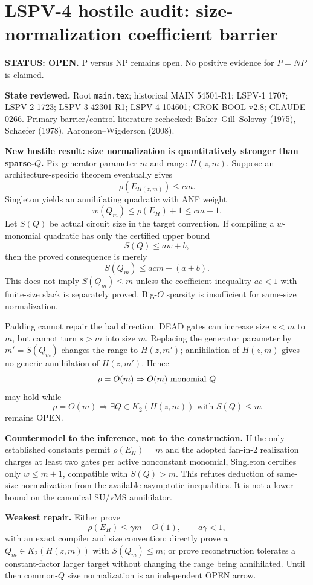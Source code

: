 \documentclass[11pt]{article}
\begin{document}
\section*{LSPV-4 hostile audit: size-normalization coefficient barrier}
\textbf{STATUS: OPEN.} P versus NP remains open. No positive evidence for $P=NP$ is claimed.

\textbf{State reviewed.} Root \texttt{main.tex}; historical MAIN 54501-R1; LSPV-1 1707; LSPV-2 1723; LSPV-3 42301-R1; LSPV-4 104601; GROK BOOL v2.8; CLAUDE-0266. Primary barrier/control literature rechecked: Baker--Gill--Solovay (1975), Schaefer (1978), Aaronson--Wigderson (2008).

\textbf{New hostile result: size normalization is quantitatively stronger than sparse-$Q$.}
Fix generator parameter $m$ and range $H(z,m)$. Suppose an architecture-specific theorem eventually gives
\[
\rho(E_{H(z,m)})\le c m.
\]
Singleton yields an annihilating quadratic with ANF weight
\[
w(Q_m)\le \rho(E_H)+1\le cm+1.
\]
Let $S(Q)$ be actual circuit size in the target convention. If compiling a $w$-monomial quadratic has only the certified upper bound
\[
S(Q)\le a w+b,
\]
then the proved consequence is merely
\[
S(Q_m)\le acm+(a+b).
\]
This does not imply $S(Q_m)\le m$ unless the coefficient inequality $ac<1$ with finite-size slack is separately proved. Big-$O$ sparsity is insufficient for same-size normalization.

Padding cannot repair the bad direction. DEAD gates can increase size $s<m$ to $m$, but cannot turn $s>m$ into size $m$. Replacing the generator parameter by $m'=S(Q_m)$ changes the range to $H(z,m')$; annihilation of $H(z,m)$ gives no generic annihilation of $H(z,m')$. Hence
\[
\rho=O(m)\Rightarrow O(m)\hbox{-monomial }Q
\]
may hold while
\[
\rho=O(m)\Rightarrow \exists Q\in K_2(H(z,m))\text{ with }S(Q)\le m
\]
remains OPEN.

\textbf{Countermodel to the inference, not to the construction.}
If the only established constants permit $\rho(E_H)=m$ and the adopted fan-in-2 realization charges at least two gates per active nonconstant monomial, Singleton certifies only $w\le m+1$, compatible with $S(Q)>m$. This refutes deduction of same-size normalization from the available asymptotic inequalities. It is not a lower bound on the canonical SU/vMS annihilator.

\textbf{Weakest repair.}
Either prove
\[
\rho(E_H)\le\gamma m-O(1),\qquad a\gamma<1,
\]
with an exact compiler and size convention; directly prove a $Q_m\in K_2(H(z,m))$ with $S(Q_m)\le m$; or prove reconstruction tolerates a constant-factor larger target without changing the range being annihilated. Until then common-$Q$ size normalization is an independent OPEN arrow.
\end{document}
